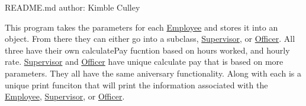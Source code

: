 R\+E\+A\+D\+M\+E.\+md author\+: Kimble Culley

This program takes the parameters for each \mbox{\hyperlink{classEmployee}{Employee}} and stores it into an object. From there they can either go into a subclass, \mbox{\hyperlink{classSupervisor}{Supervisor}}, or \mbox{\hyperlink{classOfficer}{Officer}}. All three have their own calculate\+Pay fucntion based on hours worked, and hourly rate. \mbox{\hyperlink{classSupervisor}{Supervisor}} and \mbox{\hyperlink{classOfficer}{Officer}} have unique calculate pay that is based on more parameters. They all have the same aniversary functionality. Along with each is a unique print funciton that will print the information associated with the \mbox{\hyperlink{classEmployee}{Employee}}, \mbox{\hyperlink{classSupervisor}{Supervisor}}, or \mbox{\hyperlink{classOfficer}{Officer}}. 